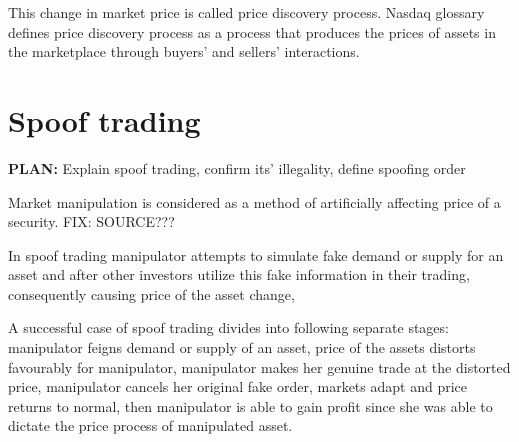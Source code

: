 \documentclass{tut-thesis}
\begin{document}
This change in market price is called price discovery process. Nasdaq glossary \autocite*{} defines price discovery process as a process that produces the prices of assets in the marketplace through buyers' and sellers' interactions.





\section{Spoof trading}
\textbf{PLAN:} Explain spoof trading, confirm its' illegality, define spoofing order

Market manipulation is considered as a method of artificially affecting price of a security. FIX: SOURCE???


\autocite{KyleViswanathan2008}

In spoof trading manipulator attempts to simulate fake demand or supply for an asset and after other investors utilize this fake information in their trading, consequently causing price of the asset change, 

A successful case of spoof trading divides into following separate stages: manipulator feigns demand or supply of an asset, price of the assets distorts favourably for manipulator, manipulator makes her genuine trade at the distorted price, manipulator cancels her original fake order, markets adapt and price returns to normal, then manipulator is able to gain profit since she was able to dictate the price process of manipulated asset.
\end{document}
